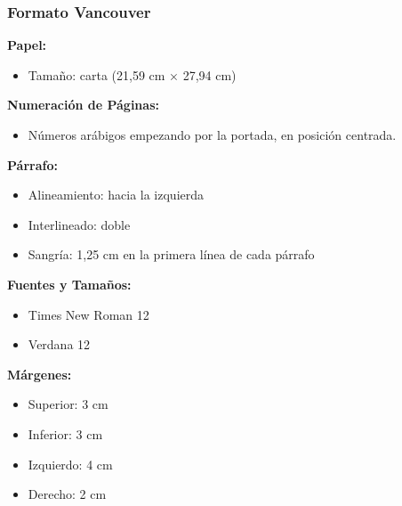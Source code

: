 \documentclass[
11pt, %
]{beamer}
\begin{document}
\begin{frame}
	\frametitle{Formato Vancouver}

	\textbf{Papel:}
	\begin{itemize}
		\item Tamaño: carta (21,59 cm × 27,94 cm)
	\end{itemize}

	\textbf{Numeración de Páginas:}
	\begin{itemize}
		\item Números arábigos empezando por la portada, en posición centrada.
	\end{itemize}

	\textbf{Párrafo:}
	\begin{itemize}
		\item Alineamiento: hacia la izquierda
		\item Interlineado: doble
		\item Sangría: 1,25 cm en la primera línea de cada párrafo
	\end{itemize}

	\textbf{Fuentes y Tamaños:}
	\begin{itemize}
		\item Times New Roman 12
		\item Verdana 12
	\end{itemize}

	\textbf{Márgenes:}
	\begin{itemize}
		\item Superior: 3 cm
		\item Inferior: 3 cm
		\item Izquierdo: 4 cm
		\item Derecho: 2 cm
	\end{itemize}

\end{frame}
\end{document}
